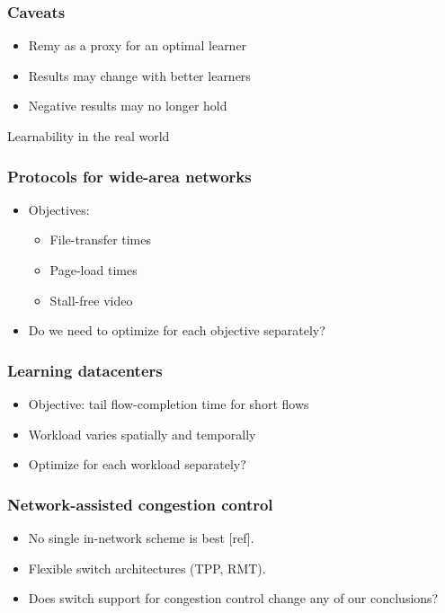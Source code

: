 \documentclass[svgnames]{beamer}
\begin{document}
\begin{Large}






 



\begin{frame}
\frametitle{Caveats}
\begin{itemize}
\item<2-> Remy as a proxy for an optimal learner
\item<3-> Results may change with better learners
\item<4-> Negative results may no longer hold
\end{itemize}
\end{frame}

\begin{frame}
\begin{center}
Learnability in the real world
\end{center}
\end{frame}

\begin{frame}
\frametitle{Protocols for wide-area networks}
\begin{itemize}
\item<1-> Objectives:
\begin{itemize}
\item File-transfer times
\item Page-load times
\item Stall-free video
\end{itemize}
\item<2-> Do we need to optimize for each objective separately?
\end{itemize}
\end{frame}

\begin{frame}
\frametitle{Learning datacenters}
\begin{itemize}
\item<1-> Objective: tail flow-completion time for short flows
\item<2-> Workload varies spatially and temporally
\item<3-> Optimize for each workload separately?
\end{itemize}
\end{frame}

\begin{frame}
\frametitle{Network-assisted congestion control}
\begin{itemize}
\item<1-> No single in-network scheme is best [ref].
\item<2-> Flexible switch architectures (TPP, RMT).
\item<3-> Does switch support for congestion control change any of
our conclusions?
\end{itemize}
\end{frame}


\end{Large}
\end{document}
